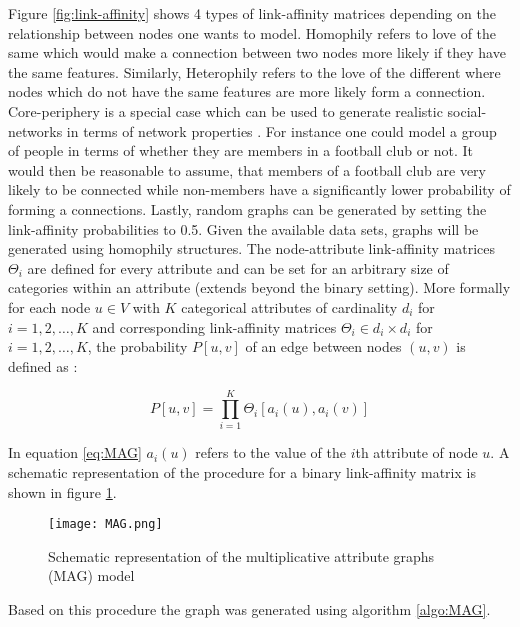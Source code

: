 	\noindent Figure \ref{fig:link-affinity} shows 4 types of link-affinity
	matrices depending on the relationship between nodes one wants to model.
	Homophily refers to love of the same which would make a connection between
	two nodes more likely if they have the same features. Similarly,
	Heterophily refers to the love of the different where nodes which do not
	have the same features are more likely form a connection. Core-periphery is
	a special case which can be used to generate realistic social-networks in
	terms of network properties \citep[p. 139]{kim2012multiplicative}. For
	instance one could model a group of people in terms of whether they are
	members in a football club or not. It would then be reasonable to assume,
	that members of a football club are very likely to be connected while
	non-members have a significantly lower probability of forming a
	connections. Lastly, random graphs can be generated by setting the
	link-affinity probabilities to 0.5. Given the available data sets, graphs 
	will be generated using homophily structures. The node-attribute
	link-affinity matrices $\Theta_i$ are defined for every attribute and can
	be set for an arbitrary size of categories within an attribute (extends
	beyond the binary setting). More formally for each node $u \in V$ with $K$
	categorical attributes of cardinality $d_i$ for $i = 1,2,\dots,K$ and
	corresponding link-affinity matrices $\Theta_i \in d_i \times d_i$ for
	$i=1,2,\dots,K$, the probability $P[u,v]$ of an edge between nodes
	$(u,v)$ is defined as \citep[p. 119]{kim2012multiplicative}:

	\begin{equation}
		P[u,v] = \prod_{i=1}^{K}\Theta_{i}[a_{i}(u),a_i(v)]
		\label{eq:MAG}
	\end{equation}

	\noindent In equation \ref{eq:MAG} $a_{i}(u)$ refers to the value of the 
	$i$th attribute of node $u$. A schematic representation of the procedure
	for a binary link-affinity matrix is shown in figure \ref{fig:MAG}.

	\begin{figure}[h]
		\centering
		\texttt{[image: MAG.png]}
		\caption{Schematic representation of the 
			multiplicative attribute graphs (MAG) model}
		\cite[p. 120]{kim2012multiplicative}
		\label{fig:MAG}
	\end{figure}
	
	\noindent Based on this procedure the graph was generated using algorithm
	\ref{algo:MAG}.


